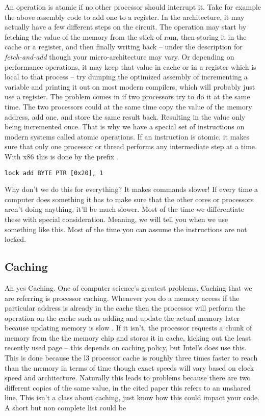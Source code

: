 An operation is atomic if no other processor should interrupt it. Take for example the above assembly code to add one to a register.
In the architecture, it may actually have a few different steps on the circuit.
The operation may start by fetching the value of the memory from the stick of ram, then storing it in the cache or a register, and then finally writing back \cite{schweizer2015evaluating} -- under the description for \textit{fetch-and-add} though your micro-architecture may vary.
Or depending on performance operations, it may keep that value in cache or in a register which is local to that process -- try dumping the  optimized assembly of incrementing a variable and printing it out on most modern compilers, which will probably just use a register.
The problem comes in if two processors try to do it at the same time.
The two processors could at the same time copy the value of the memory address, add one, and store the same result back.
Resulting in the value only being incremented once.
That is why we have a special set of instructions on modern systems called atomic operations.
If an instruction is atomic, it makes sure that only one processor or thread performs any intermediate step at a time.
With x86 this is done by the  prefix \cite[p. 1120]{guide2011intel}.

\begin{lstlisting}
lock add BYTE PTR [0x20], 1
\end{lstlisting}

Why don't we do this for everything?
It makes commands slower! If every time a computer does something it has to make sure that the other cores or processors aren't doing anything, it'll be much slower.
Most of the time we differentiate these with special consideration.
Meaning, we will tell you when we use something like this.
Most of the time you can assume the instructions are not locked.

\subsection{Caching}

Ah yes Caching.
One of computer science's greatest problems.
Caching that we are referring is processor caching.
Whenever you do a memory access if the particular address is already in the cache then the processor will perform the operation on the cache such as adding and update the actual memory later because updating memory is slow \cite[Section 3.4]{intel2015improving}.
If it isn't, the processor requests a chunk of memory from the the memory chip and stores it in cache, kicking out the least recently used page -- this depends on caching policy, but Intel's does use this.
This is done because the l3 processor cache is roughly three times faster to reach than the memory in terms of time \cite[p. 22]{levinthal2009performance} though exact speeds will vary based on clock speed and architecture.
Naturally this leads to problems because there are two different copies of the same value, in the cited paper this refers to an unshared line.
This isn't a class about caching, just know how this could impact your code.
A short but non complete list could be

